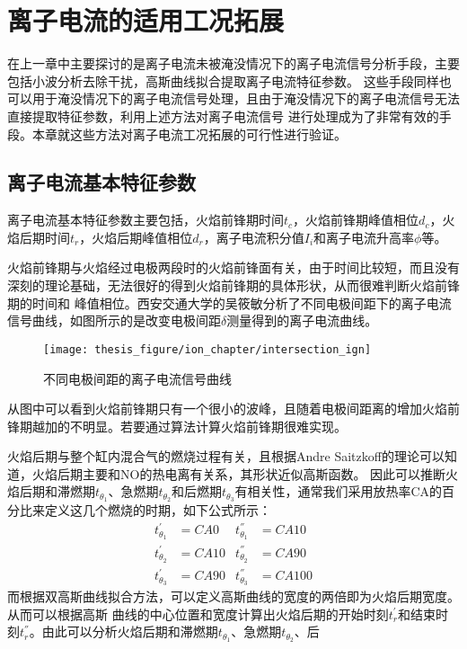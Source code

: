 \chapter{离子电流的适用工况拓展}
在上一章中主要探讨的是离子电流未被淹没情况下的离子电流信号分析手段，主要包括小波分析去除干扰，高斯曲线拟合提取离子电流特征参数。
这些手段同样也可以用于淹没情况下的离子电流信号处理，且由于淹没情况下的离子电流信号无法直接提取特征参数，利用上述方法对离子电流信号
进行处理成为了非常有效的手段。本章就这些方法对离子电流工况拓展的可行性进行验证。
\section{离子电流基本特征参数}
离子电流基本特征参数主要包括，火焰前锋期时间$t_c$，火焰前锋期峰值相位$d_c$，火焰后期时间$t_r$，火焰后期峰值相位$d_r$，离子电流积分值$I_i$和离子电流升高率$\phi$等。\par
火焰前锋期与火焰经过电极两段时的火焰前锋面有关，由于时间比较短，而且没有深刻的理论基础，无法很好的得到火焰前锋期的具体形状，从而很难判断火焰前锋期的时间和
峰值相位。西安交通大学的吴筱敏\cite{iign}分析了不同电极间距下的离子电流信号曲线，如图\label{fig:intersection_ign}所示的是改变电极间距$\delta$测量得到的离子电流曲线。
\begin{figure}[!htpb]
	\centering
	\texttt{[image: thesis\_figure/ion\_chapter/intersection\_ign]}
	\caption{\label{fig:intersection_ign}不同电极间距的离子电流信号曲线}
\end{figure}
从图\label{fig:intersection_ign}中可以看到火焰前锋期只有一个很小的波峰，且随着电极间距离的增加火焰前锋期越加的不明显。若要通过算法计算火焰前锋期很难实现。\par
火焰后期与整个缸内混合气的燃烧过程有关，且根据Andre Saitzkoff\cite{saitzkoff1996ionization}的理论可以知道，火焰后期主要和NO的热电离有关系，其形状近似高斯函数。
因此可以推断火焰后期和滞燃期$t_{\theta_1}$、急燃期$t_{\theta_2}$和后燃期$t_{\theta_3}$有相关性，通常我们采用放热率CA的百分比来定义这几个燃烧的时期，如下公式所示：
\begin{align}
	t_{\theta_1}^{'} &= CA0  & t_{\theta_1}^{''} &=CA10 \\
	t_{\theta_2}^{'} &= CA10 & t_{\theta_2}^{''} &=CA90 \\
	t_{\theta_3}^{'} &= CA90 & t_{\theta_3}^{''} &=CA100 
\end{align}
而根据双高斯曲线拟合方法，可以定义高斯曲线的宽度的两倍即为火焰后期宽度。从而可以根据高斯
曲线的中心位置和宽度计算出火焰后期的开始时刻$t_{r}^{'}$和结束时刻$t_{r}^{''}$。由此可以分析火焰后期和滞燃期$t_{\theta_1}$、急燃期$t_{\theta_2}$、后
